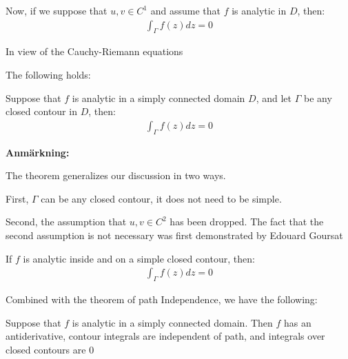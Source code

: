 \par\bigskip
\noindent Now, if we suppose that $u,v\in C^1$ and assume that $f$ is analytic in $D$, then:
\begin{equation*}
  \begin{gathered}
    \int_{\Gamma}f(z)dz = 0
  \end{gathered}
\end{equation*}\par
\noindent In view of the Cauchy-Riemann equations
\par\bigskip
\noindent The following holds:
\par\bigskip
\begin{theo}{}
  Suppose that $f$ is analytic in a simply connected domain $D$, and let $\Gamma$ be any closed contour in $D$, then:
  \begin{equation*}
    \begin{gathered}
      \int_{\Gamma}f(z)dz = 0
    \end{gathered}
  \end{equation*}
\end{theo}
\par\bigskip
\noindent\textbf{Anmärkning:}\par
\noindent The theorem generalizes our discussion in two ways.\par
\noindent First, $\Gamma$ can be any closed contour, it does not need to be simple.\par
\noindent Second, the assumption that $u,v\in C^2$ has been dropped. The fact that the second assumption is not necessary was first demonstrated by Edouard Goursat
\par\bigskip
\begin{theo}{}
  If $f$ is analytic inside and on a simple closed contour, then:
  \begin{equation*}
    \begin{gathered}
      \int_{\Gamma}f(z)dz = 0
    \end{gathered}
  \end{equation*}
\end{theo}
\par\bigskip
\noindent Combined with the theorem of path Independence, we have the following:
\par\bigskip
\begin{theo}[]{}
  Suppose that $f$ is analytic in a simply connected domain. Then $f$ has an antiderivative, contour integrals are independent of path, and integrals over closed contours are 0
\end{theo}
